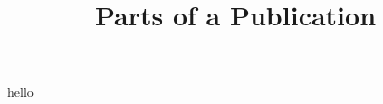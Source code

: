 \documentclass{article}
\begin{document}
\title{Parts of a Publication}

\maketitle


hello
\end{document}
